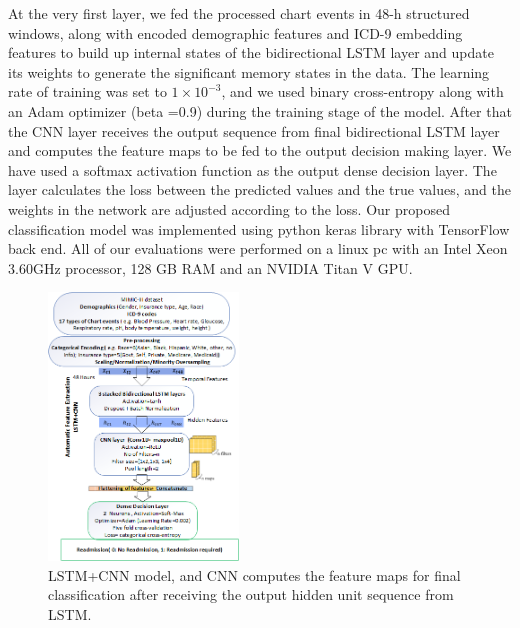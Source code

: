 \documentclass[letterpaper, 10pt, conference]{ieeeconf} %
\begin{document}
At the very first layer, we fed the  processed chart events in 48-h structured windows, along with encoded demographic features and ICD-9 embedding features to build up internal states of the bidirectional LSTM layer and update its weights to generate the significant memory states in the data.
The learning rate of training was set to $1\times 10^{-3}$, and we used binary cross-entropy along with an Adam optimizer (beta =0.9) during the training stage of the model.
After that the CNN layer receives the output sequence from final bidirectional  LSTM layer and computes the feature maps to be fed to the output decision making layer.
We have used a softmax activation function as the output dense decision layer. The layer calculates the loss between the predicted values and the true values, and the weights in the network are adjusted according to the loss. Our proposed classification model was implemented using python keras library \cite{keras} with TensorFlow back end. All of our evaluations were performed on a linux pc with an Intel Xeon 3.60GHz processor, 128 GB RAM and an NVIDIA Titan V GPU. 

\begin{figure}
    \centering
\includegraphics[width=0.45\textwidth]{Figures/mimic3_readmission.png}
\caption{LSTM+CNN model, and CNN computes the feature maps for final classification after receiving the output hidden unit sequence from LSTM.}
\label{fig:lstm}
  \end{figure}   
\end{document}

